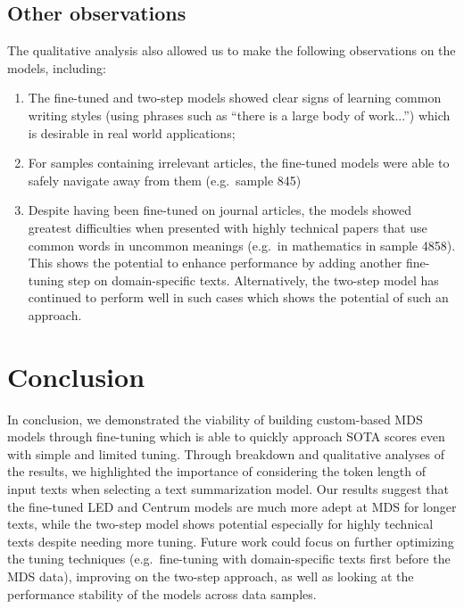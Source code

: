 \documentclass[12pt, twocolumn]{article}
\numberwithin{equation}{section}
\begin{document}
\subsection{Other observations}
\label{ssec:results-other}

The qualitative analysis also allowed us to make the following observations on the models, including:

\begin{enumerate}
    \item The fine-tuned and two-step models showed clear signs of learning common writing styles (using phrases such as ``there is a large body of work...'') which is desirable in real world applications;
    \item For samples containing irrelevant articles, the fine-tuned models were able to safely navigate away from them (e.g.~sample 845)
    \item Despite having been fine-tuned on journal articles, the models showed greatest difficulties when presented with highly technical papers that use common words in uncommon meanings (e.g.~in mathematics in sample 4858).  This shows the potential to enhance performance by adding another fine-tuning step on domain-specific texts.  Alternatively, the two-step model has continued to perform well in such cases which shows the potential of such an approach.
\end{enumerate}

\section{Conclusion}
\label{sec:conclusion}

In conclusion, we demonstrated the viability of building custom-based MDS models through fine-tuning which is able to quickly approach SOTA scores even with simple and limited tuning.  Through breakdown and qualitative analyses of the results, we highlighted the importance of considering the token length of input texts when selecting a text summarization model. Our results suggest that the fine-tuned LED and Centrum models are much more adept at MDS for longer texts, while the two-step model shows potential especially for highly technical texts despite needing more tuning. Future work could focus on further optimizing the tuning techniques (e.g.~fine-tuning with domain-specific texts first before the MDS data), improving on the two-step approach, as well as looking at the performance stability of the models across data samples.
\end{document}
